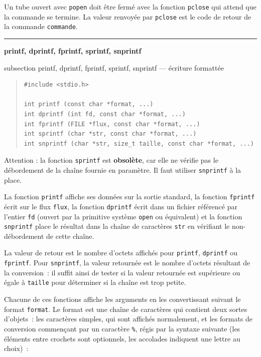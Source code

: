 \documentclass [twoside] {report}
\newcommand {\primitive} [1]
    {
	\phantomsection
	{\large \textbf {#1}}
	\addcontentsline {toc} {subsection} {#1}
    }
\newcommand {\separation}
    {
	\vspace {5mm}
	\nopagebreak
	\hrule
    }
\begin{document}
Un tube ouvert avec \texttt {popen} doit être fermé avec la
fonction \texttt {pclose} qui attend que la commande se termine. La
valeur renvoyée par \texttt {pclose} est le code de retour de la
commande \texttt {commande}.



\separation
\primitive {printf, dprintf, fprintf, sprintf, snprintf} --- écriture formattée

\begin {quote}
\begin {verbatim}
#include <stdio.h>

int printf (const char *format, ...)
int dprintf (int fd, const char *format, ...)
int fprintf (FILE *flux, const char *format, ...)
int sprintf (char *str, const char *format, ...)
int snprintf (char *str, size_t taille, const char *format, ...)
\end{verbatim}
\end {quote}

Attention : la fonction \texttt {sprintf} est \textbf {obsolète}, car elle ne
vérifie pas le débordement de la chaîne fournie en paramètre. Il faut
utiliser \texttt {snprintf} à la place.

La fonction \texttt {printf} affiche ses données sur la sortie standard, la
fonction \texttt {fprintf} écrit sur le flux \texttt {flux}, la fonction \texttt
{dprintf} écrit dans un fichier référencé par l'entier \texttt {fd}
(ouvert par la primitive système \texttt {open} ou équivalent) et la
fonction \texttt {snprintf} place le résultat dans la chaîne de caractères
\texttt {str} en vérifiant le non-débordement de cette chaîne.

La valeur de retour est le nombre d'octets affichés pour \texttt
{printf}, \texttt {dprintf} ou \texttt {fprintf}. Pour \texttt {snprintf},
la valeur retournée est le nombre d'octets résultant de la conversion~:
il suffit ainsi de tester si la valeur retournée est supérieure ou
égale à \texttt {taille} pour déterminer si la chaîne est trop petite.

Chacune de ces fonctions affiche les arguments en les convertissant
suivant le format \texttt {format}.  Le format est une chaîne de caractères
qui contient deux sortes d'objets~:  les caractères simples, qui sont
affichés normalement, et les formats de conversion commençant par un
caractère \texttt {\%}, régis par la syntaxe suivante (les éléments entre
crochets sont optionnels, les accolades indiquent une lettre au choix)~:
\end{document}
